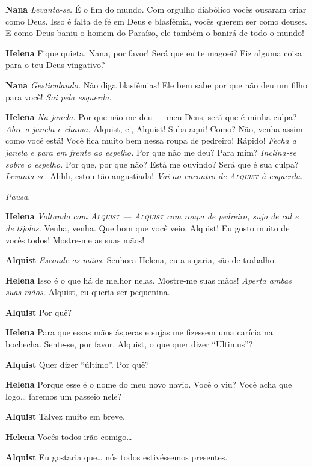 \textbf{Nana} \emph{Levanta-se.} É o fim do mundo. Com orgulho diabólico vocês ousaram
criar como Deus. Isso é falta de fé em Deus e blasfêmia, vocês querem ser como
deuses. E como Deus baniu o homem do Paraíso, ele também o banirá de todo o
mundo!

\textbf{Helena} Fique quieta, Nana, por favor! Será que eu te magoei? Fiz alguma coisa
para o teu Deus vingativo?

\textbf{Nana} \emph{Gesticulando.} Não diga blasfêmias! Ele bem sabe por que não deu
um filho para você! \emph{Sai pela esquerda.}

\textbf{Helena} \emph{Na janela.} Por que não me deu --- meu Deus, será que é minha
culpa? \emph{Abre a janela e chama.} Alquist, ei, Alquist! Suba aqui! Como? Não, venha assim
como você está! Você fica muito bem nessa roupa de pedreiro! Rápido!
\emph{Fecha a janela e para em frente ao espelho.} Por que não me deu? Para mim? \emph{Inclina-se
sobre o espelho.} Por que, por que não? Está me ouvindo? Será que é sua culpa?
\emph{Levanta-se.} Ahhh, estou tão angustiada! \emph{Vai ao encontro de
\textsc{Alquist} à esquerda.}

\emph{Pausa.}

\textbf{Helena} \emph{Voltando com \textsc{Alquist} --- \textsc{Alquist} com roupa de pedreiro, sujo de
cal e de tijolos.} Venha, venha. Que bom que você veio, Alquist! Eu gosto muito
de vocês todos! Mostre-me as suas mãos!

\textbf{Alquist} \emph{Esconde as mãos.} Senhora Helena, eu a sujaria, são de
trabalho.

\textbf{Helena} Isso é o que há de melhor nelas. Mostre-me suas mãos! \emph{Aperta
ambas suas mãos.} Alquist, eu queria ser pequenina.

\textbf{Alquist} Por quê?

\textbf{Helena} Para que essas mãos ásperas e sujas me fizessem uma carícia na bochecha.
Sente-se, por favor. Alquist, o que quer dizer ``Ultimus''?

\textbf{Alquist} Quer dizer ``último''. Por quê?

\textbf{Helena} Porque esse é o nome do meu novo navio. Você o viu? Você acha que logo\ldots{}
faremos um passeio nele?

\textbf{Alquist} Talvez muito em breve.

\textbf{Helena} Vocês todos irão comigo\ldots{}

\textbf{Alquist} Eu gostaria que\ldots{} nós todos estivéssemos presentes.

